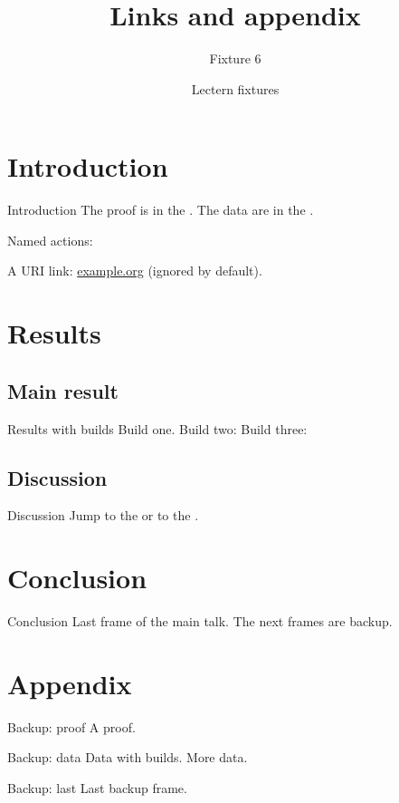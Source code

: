 \documentclass[aspectratio=169]{beamer}
\title{Links and appendix}
\subtitle{Fixture 6}
\author{Lectern fixtures}
\date{}
\begin{document}
\begin{frame}
  \titlepage
\end{frame}
\section{Introduction}
\begin{frame}{Introduction}
  The proof is in the \hyperlink{backup-proof}{}.
  The data are in the \hyperlink{backup-data}{}.

  \medskip
  Named actions:

  \medskip
  A URI link: \href{https://example.org/}{example.org} (ignored by default).
\end{frame}
\section{Results}
\subsection{Main result}
\begin{frame}{Results with builds}
  Build one.
  \pause
  Build two: 
  \pause
  Build three: 
\end{frame}
\subsection{Discussion}
\begin{frame}{Discussion}
  Jump to the  or to the
  .
\end{frame}
\section{Conclusion}
\begin{frame}{Conclusion}
  Last frame of the main talk. The next frames are backup.
\end{frame}
\appendix
\section{Appendix}
\begin{frame}[label=backup-proof]{Backup: proof}
  A proof. 
\end{frame}
\begin{frame}[label=backup-data]{Backup: data}
  Data with builds.
  \pause
  More data. 
\end{frame}
\begin{frame}{Backup: last}
  Last backup frame.
\end{frame}
\end{document}
